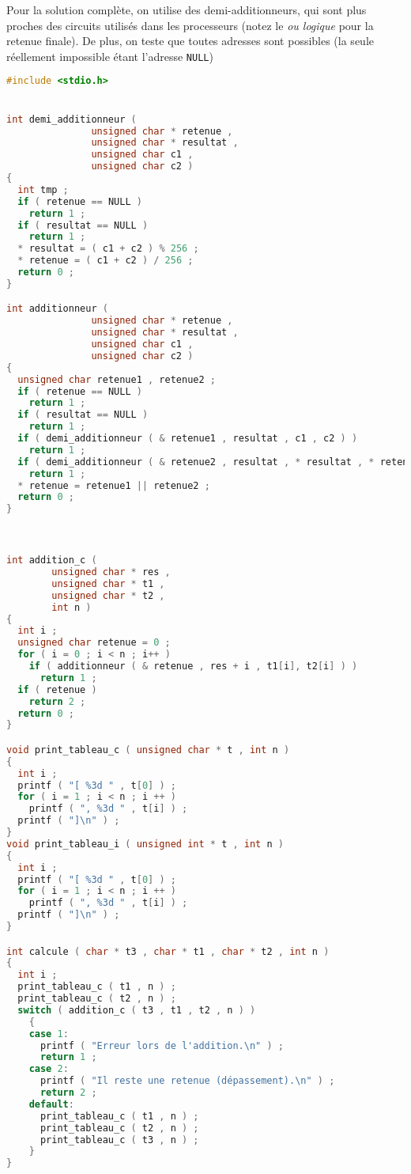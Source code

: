 \begin{solution}
  Pour la solution complète, on utilise des demi-additionneurs, qui
  sont plus proches des circuits utilisés dans les processeurs (notez
  le \emph{ou logique} pour la retenue finale). De plus, on teste que
  toutes adresses sont possibles (la seule réellement impossible étant 
  l'adresse \texttt{NULL})
  \begin{lstlisting}[language=C]
#include <stdio.h>


int demi_additionneur (
		       unsigned char * retenue ,
		       unsigned char * resultat ,
		       unsigned char c1 ,
		       unsigned char c2 )
{
  int tmp ;
  if ( retenue == NULL )
    return 1 ;
  if ( resultat == NULL )
    return 1 ;
  * resultat = ( c1 + c2 ) % 256 ;
  * retenue = ( c1 + c2 ) / 256 ;
  return 0 ;
}

int additionneur (
		       unsigned char * retenue ,
		       unsigned char * resultat ,
		       unsigned char c1 ,
		       unsigned char c2 )
{
  unsigned char retenue1 , retenue2 ;
  if ( retenue == NULL )
    return 1 ;
  if ( resultat == NULL )
    return 1 ;
  if ( demi_additionneur ( & retenue1 , resultat , c1 , c2 ) )
    return 1 ;
  if ( demi_additionneur ( & retenue2 , resultat , * resultat , * retenue ) )
    return 1 ;
  * retenue = retenue1 || retenue2 ;
  return 0 ;
}



int addition_c (
		unsigned char * res ,
		unsigned char * t1 ,
		unsigned char * t2 ,
		int n )
{
  int i ;
  unsigned char retenue = 0 ;
  for ( i = 0 ; i < n ; i++ )
    if ( additionneur ( & retenue , res + i , t1[i], t2[i] ) )
      return 1 ;
  if ( retenue )
    return 2 ;
  return 0 ;
}

void print_tableau_c ( unsigned char * t , int n )
{
  int i ;
  printf ( "[ %3d " , t[0] ) ;
  for ( i = 1 ; i < n ; i ++ )
    printf ( ", %3d " , t[i] ) ;
  printf ( "]\n" ) ;
}
void print_tableau_i ( unsigned int * t , int n )
{
  int i ;
  printf ( "[ %3d " , t[0] ) ;
  for ( i = 1 ; i < n ; i ++ )
    printf ( ", %3d " , t[i] ) ;
  printf ( "]\n" ) ;
}

int calcule ( char * t3 , char * t1 , char * t2 , int n )
{
  int i ;
  print_tableau_c ( t1 , n ) ;
  print_tableau_c ( t2 , n ) ;
  switch ( addition_c ( t3 , t1 , t2 , n ) )
    {
    case 1:
      printf ( "Erreur lors de l'addition.\n" ) ;
      return 1 ;
    case 2:
      printf ( "Il reste une retenue (dépassement).\n" ) ;
      return 2 ;
    default:
      print_tableau_c ( t1 , n ) ;
      print_tableau_c ( t2 , n ) ;
      print_tableau_c ( t3 , n ) ;
    }
}


\end{lstlisting}
\end{solution}
